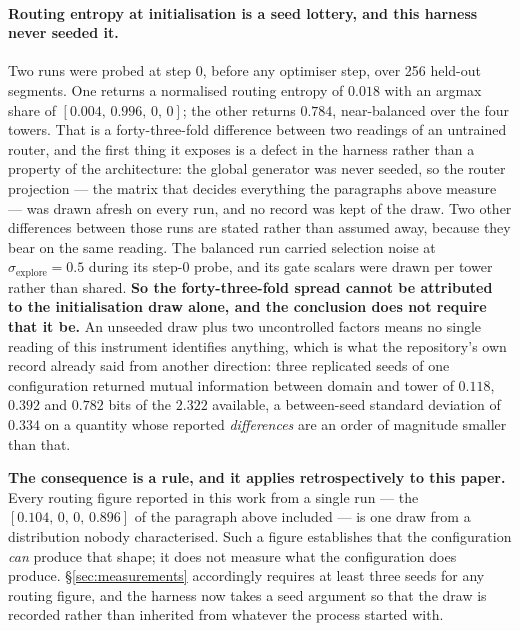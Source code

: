 \documentclass[11pt]{article}
\begin{document}
\paragraph{Routing entropy at initialisation is a seed lottery, and this harness never seeded it.} Two runs were probed at step 0, before any optimiser step, over 256 held-out segments. One returns a normalised routing entropy of $0.018$ with an argmax share of $[0.004,\, 0.996,\, 0,\, 0]$; the other returns $0.784$, near-balanced over the four towers. That is a forty-three-fold difference between two readings of an untrained router, and the first thing it exposes is a defect in the harness rather than a property of the architecture: the global generator was never seeded, so the router projection --- the matrix that decides everything the paragraphs above measure --- was drawn afresh on every run, and no record was kept of the draw. Two other differences between those runs are stated rather than assumed away, because they bear on the same reading. The balanced run carried selection noise at $\sigma_{\mathrm{explore}} = 0.5$ during its step-0 probe, and its gate scalars were drawn per tower rather than shared. \textbf{So the forty-three-fold spread cannot be attributed to the initialisation draw alone, and the conclusion does not require that it be.} An unseeded draw plus two uncontrolled factors means no single reading of this instrument identifies anything, which is what the repository's own record already said from another direction: three replicated seeds of one configuration returned mutual information between domain and tower of $0.118$, $0.392$ and $0.782$ bits of the $2.322$ available, a between-seed standard deviation of $0.334$ on a quantity whose reported \emph{differences} are an order of magnitude smaller than that.

\textbf{The consequence is a rule, and it applies retrospectively to this paper.} Every routing figure reported in this work from a single run --- the $[0.104,\, 0,\, 0,\, 0.896]$ of the paragraph above included --- is one draw from a distribution nobody characterised. Such a figure establishes that the configuration \emph{can} produce that shape; it does not measure what the configuration does produce. \S\ref{sec:measurements} accordingly requires at least three seeds for any routing figure, and the harness now takes a seed argument so that the draw is recorded rather than inherited from whatever the process started with.
\end{document}
